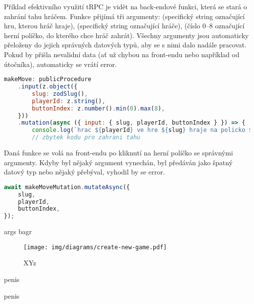 Příklad efektivního využití tRPC je vidět na back-endové funkci, která se stará
o zahrání tahu hráčem. Funkce přijímá tři argumenty:  (specifický
string označující hru, kterou hráč hraje),  (specifický string
označující hráče),  (číslo 0--8 označující herní políčko, do
kterého chce hráč zahrát). Všechny argumenty jsou automaticky přeloženy do
jejich správných datových typů, aby se s nimi dalo nadále pracovat. Pokud by
přišla nevalidní data (ať už chybou na front-endu nebo například od útočníka),
automaticky se vrátí error.

\begin{lstlisting}[language=JavaScript,caption={Funkce pro zahrání tahu},label={fig:be-make-move}]
makeMove: publicProcedure
    .input(z.object({
        slug: zodSlug(),
        playerId: z.string(),
        buttonIndex: z.number().min(0).max(8),
    }))
    .mutation(async ({ input: { slug, playerId, buttonIndex } }) => {
        console.log(`hrac ${playerId} ve hre ${slug} hraje na policko ${buttonIndex}`);
        // zbytek kodu pro zahrani tahu
\end{lstlisting}

Daná funkce se volá na front-endu po kliknutí na herní políčko se správnými
argumenty. Kdyby byl nějaký argument vynechán, byl předáván jako špatný datový
typ nebo nějaký přebýval, vyhodil by se error.

\begin{lstlisting}[language=JavaScript,caption={Volání funkce pro zahrání tahu},label={fig:fe-make-move}]
await makeMoveMutation.mutateAsync({
    slug,
    playerId,
    buttonIndex,
});
\end{lstlisting}

args
bagr

\begin{figure}[h]
    \centering
    \texttt{[image: img/diagrams/create-new-game.pdf]}
    \caption{XYz}
    \label{fig:create-new-game}
\end{figure}

penis

penis
